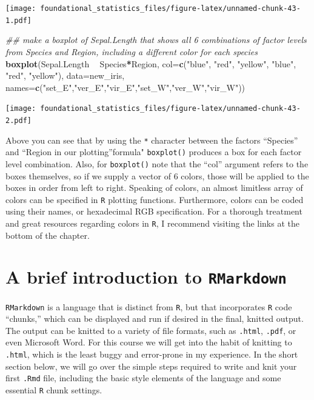 \documentclass[]{book}
\newenvironment{Shaded}{\begin{snugshade}}{\end{snugshade}}
\newcommand{\CommentTok}[1]{\textcolor[rgb]{0.56,0.35,0.01}{\textit{#1}}}
\newcommand{\DataTypeTok}[1]{\textcolor[rgb]{0.13,0.29,0.53}{#1}}
\newcommand{\KeywordTok}[1]{\textcolor[rgb]{0.13,0.29,0.53}{\textbf{#1}}}
\newcommand{\NormalTok}[1]{#1}
\newcommand{\OperatorTok}[1]{\textcolor[rgb]{0.81,0.36,0.00}{\textbf{#1}}}
\newcommand{\StringTok}[1]{\textcolor[rgb]{0.31,0.60,0.02}{#1}}
\begin{document}
\texttt{[image: foundational\_statistics\_files/figure-latex/unnamed-chunk-43-1.pdf]}

\begin{Shaded}
\begin{Highlighting}[]
\CommentTok{## make a boxplot of Sepal.Length that shows all 6 combinations of factor levels from Species and Region, including a different color for each species}
\KeywordTok{boxplot}\NormalTok{(Sepal.Length }\OperatorTok{~}\StringTok{ }\NormalTok{Species}\OperatorTok{*}\NormalTok{Region, }\DataTypeTok{col=}\KeywordTok{c}\NormalTok{(}\StringTok{"blue"}\NormalTok{, }\StringTok{"red"}\NormalTok{, }\StringTok{"yellow"}\NormalTok{, }\StringTok{"blue"}\NormalTok{, }\StringTok{"red"}\NormalTok{, }\StringTok{"yellow"}\NormalTok{),}
        \DataTypeTok{data=}\NormalTok{new_iris, }\DataTypeTok{names=}\KeywordTok{c}\NormalTok{(}\StringTok{"set_E"}\NormalTok{,}\StringTok{"ver_E"}\NormalTok{,}\StringTok{"vir_E"}\NormalTok{,}\StringTok{"set_W"}\NormalTok{,}\StringTok{"ver_W"}\NormalTok{,}\StringTok{"vir_W"}\NormalTok{))}
\end{Highlighting}
\end{Shaded}

\texttt{[image: foundational\_statistics\_files/figure-latex/unnamed-chunk-43-2.pdf]}

Above you can see that by using the \texttt{*} character between the factors ``Species'' and ``Region in our plotting''formula" \texttt{boxplot()} produces a box for each factor level combination. Also, for \texttt{boxplot()} note that the ``col'' argument refers to the boxes themselves, so if we supply a vector of 6 colors, those will be applied to the boxes in order from left to right. Speaking of colors, an almost limitless array of colors can be specified in \texttt{R} plotting functions. Furthermore, colors can be coded using their names, or hexadecimal RGB specification. For a thorough treatment and great resources regarding colors in \texttt{R}, I recommend visiting the links at the bottom of the chapter.

\hypertarget{a-brief-introduction-to-rmarkdown}{%
\section{\texorpdfstring{A brief introduction to \texttt{RMarkdown}}{A brief introduction to RMarkdown}}\label{a-brief-introduction-to-rmarkdown}}

\texttt{RMarkdown} is a language that is distinct from \texttt{R}, but that incorporates \texttt{R} code ``chunks,'' which can be displayed and run if desired in the final, knitted output. The output can be knitted to a variety of file formats, such as \texttt{.html}, \texttt{.pdf}, or even Microsoft Word. For this course we will get into the habit of knitting to \texttt{.html}, which is the least buggy and error-prone in my experience. In the short section below, we will go over the simple steps required to write and knit your first \texttt{.Rmd} file, including the basic style elements of the language and some essential \texttt{R} chunk settings.
\end{document}
